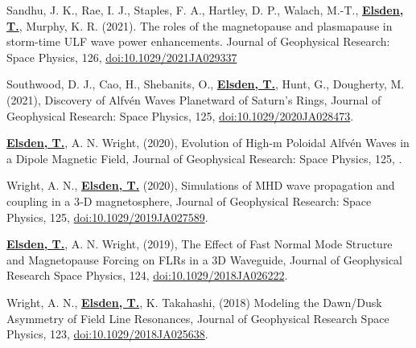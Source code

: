 \documentclass[11pt,a4paper]{article} %
\newcommand\vs{\vspace{-0.25cm}}
\begin{document}
\begin{etaremune}
\vspace{-0.5cm}

\vs
\item Sandhu, J. K., Rae, I. J., Staples, F. A., Hartley, D. P., Walach, M.-T., \underline{\textbf{Elsden, T.}}, Murphy, K. R. (2021). The roles of the magnetopause and plasmapause in storm-time ULF wave power enhancements. Journal of Geophysical Research: Space Physics, 126, \href{https://doi.org/10.1029/2021JA029337}{doi:10.1029/2021JA029337}

\vs
\item Southwood, D. J., Cao, H., Shebanits, O., \underline{\textbf{Elsden, T.}}, Hunt, G., Dougherty, M. (2021), Discovery of Alfv\'{e}n Waves Planetward of Saturn's Rings, Journal of Geophysical Research: Space Physics, 125, {\href{https://doi.org/10.1029/2020JA028473}{doi:10.1029/2020JA028473}}.

\vspace{-0.5cm}

\vs
\item \underline{\textbf{Elsden, T.}}, A. N. Wright, (2020), Evolution of High-m Poloidal Alfv\'{e}n Waves in a Dipole Magnetic Field, Journal of Geophysical Research: Space Physics, 125, .

\vs
\item Wright, A. N., \underline{\textbf{Elsden, T.}} (2020), Simulations of MHD wave propagation and coupling in a 3‐D magnetosphere, Journal of Geophysical Research: Space Physics, 125,  {\href{https://doi.org/10.1029/2019JA027589}{doi:10.1029/2019JA027589}}.

\vspace{-0.5cm}

\vs
\item \underline{\textbf{Elsden, T.}}, A. N. Wright, (2019), The Effect of Fast Normal Mode Structure and Magnetopause Forcing on FLRs in a 3D Waveguide, Journal of Geophysical Research Space Physics, 124, {\href{https://doi.org/10.1029/2018JA026222}{doi:10.1029/2018JA026222}}.

\vspace{-0.5cm}

\vs
\item Wright, A. N., \underline{\textbf{Elsden, T.}}, K. Takahashi, (2018) Modeling the Dawn/Dusk Asymmetry of Field Line Resonances, Journal of Geophysical Research Space Physics, 123, {\href{https://doi.org/10.1029/2018JA025638}{doi:10.1029/2018JA025638}}.


\end{etaremune}
\end{document}
